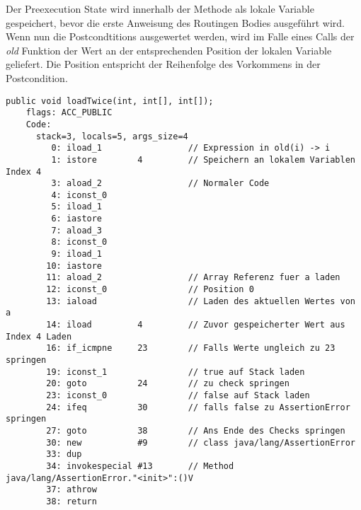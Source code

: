 Der Preexecution State wird innerhalb der Methode als lokale Variable gespeichert, bevor die erste Anweisung 
des Routingen Bodies ausgeführt wird.  Wenn nun 
die Postcondtitions ausgewertet werden, wird im Falle eines Calls der \textit{old} Funktion der Wert 
an der entsprechenden Position der lokalen Variable geliefert. Die Position entspricht der Reihenfolge 
des Vorkommens in der Postcondition.
\newline
\begin{lstlisting}[caption=Bytecode der loadTwice Prozedur mit postcondition mit Zugriff auf old State. Damit der Code etwas Übersichtlicher ist\, wurde nur die erste Postcondtition kompiliert.,label={lst:loadtwice_code_old}]
public void loadTwice(int, int[], int[]);
    flags: ACC_PUBLIC
    Code:
      stack=3, locals=5, args_size=4
         0: iload_1                 // Expression in old(i) -> i 
         1: istore        4         // Speichern an lokalem Variablen Index 4
         3: aload_2                 // Normaler Code
         4: iconst_0      
         5: iload_1       
         6: iastore       
         7: aload_3       
         8: iconst_0      
         9: iload_1       
        10: iastore       
        11: aload_2                 // Array Referenz fuer a laden
        12: iconst_0                // Position 0
        13: iaload                  // Laden des aktuellen Wertes von a
        14: iload         4         // Zuvor gespeicherter Wert aus Index 4 Laden
        16: if_icmpne     23        // Falls Werte ungleich zu 23 springen
        19: iconst_1                // true auf Stack laden
        20: goto          24        // zu check springen
        23: iconst_0                // false auf Stack laden
        24: ifeq          30        // falls false zu AssertionError springen
        27: goto          38        // Ans Ende des Checks springen
        30: new           #9        // class java/lang/AssertionError
        33: dup           
        34: invokespecial #13       // Method java/lang/AssertionError."<init>":()V
        37: athrow        
        38: return
\end{lstlisting}


